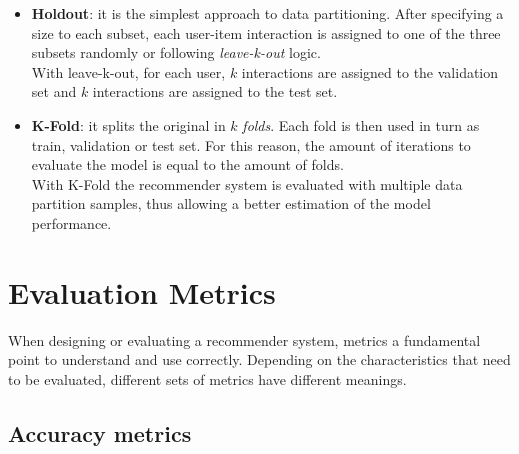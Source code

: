 \begin{itemize}
\item \textbf{Holdout}: it is the simplest approach to data partitioning. After specifying a size to each subset, each user-item interaction is assigned to one of the three subsets randomly or following \textit{leave-k-out} logic.\\
With leave-k-out, for each user, $k$ interactions are assigned to the validation set and $k$ interactions are assigned to the test set.
\item \textbf{K-Fold}: it splits the original in $k$ \textit{folds}. Each fold is then used in turn as train, validation or test set. For this reason, the amount of iterations to evaluate the model is equal to the amount of folds.\\
With K-Fold the recommender system is evaluated with multiple data partition samples, thus allowing a better estimation of the model performance.
\end{itemize}



\section{Evaluation Metrics}

When designing or evaluating a recommender system, metrics a fundamental point to understand and use correctly. Depending on the characteristics that need to be evaluated, different sets of metrics have different meanings.


\subsection{Accuracy metrics}

